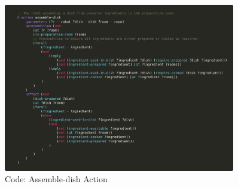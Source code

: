 \documentclass{article}
\begin{document}
    \begin{figure}[H]
    \centering
    \includegraphics[width=0.90\textwidth]{assets/assemble-dish.png}
    \caption{Code: Assemble-dish Action}
    \label{fig:act:assemble-dish}
\end{figure}
\end{document}
